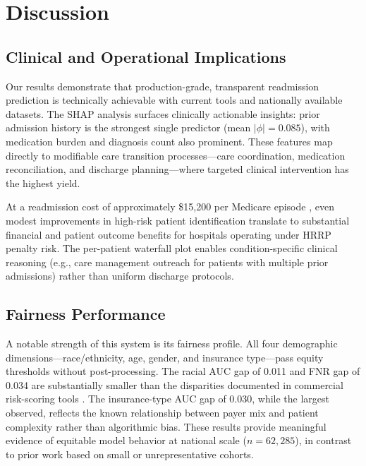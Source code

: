 \documentclass[11pt,letterpaper]{article}
\begin{document}
\section{Discussion}
\label{sec:discussion}

\subsection{Clinical and Operational Implications}

Our results demonstrate that production-grade, transparent readmission prediction is technically achievable with current tools and nationally available datasets. The SHAP analysis surfaces clinically actionable insights: prior admission history is the strongest single predictor (mean $|\phi| = 0.085$), with medication burden and diagnosis count also prominent. These features map directly to modifiable care transition processes---care coordination, medication reconciliation, and discharge planning---where targeted clinical intervention has the highest yield.

At a readmission cost of approximately \$15,200 per Medicare episode \citep{cms_nhe_2023}, even modest improvements in high-risk patient identification translate to substantial financial and patient outcome benefits for hospitals operating under HRRP penalty risk. The per-patient waterfall plot enables condition-specific clinical reasoning (e.g., care management outreach for patients with multiple prior admissions) rather than uniform discharge protocols.

\subsection{Fairness Performance}

A notable strength of this system is its fairness profile. All four demographic dimensions---race/ethnicity, age, gender, and insurance type---pass equity thresholds without post-processing. The racial AUC gap of 0.011 and FNR gap of 0.034 are substantially smaller than the disparities documented in commercial risk-scoring tools \citep{obermeyer2019dissecting}. The insurance-type AUC gap of 0.030, while the largest observed, reflects the known relationship between payer mix and patient complexity rather than algorithmic bias. These results provide meaningful evidence of equitable model behavior at national scale ($n = 62{,}285$), in contrast to prior work based on small or unrepresentative cohorts.
\end{document}
